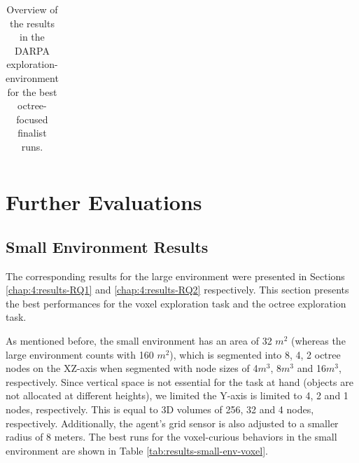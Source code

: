 \begin{longtable}{|l|c|c|c|c|}
    \caption{Overview of the results in the DARPA exploration-environment for the best octree-focused finalist runs.}
    \label{tab:results-evaluation-framework}
\end{longtable}



\newpage
\section{Further Evaluations}
\subsection{Small Environment Results}\label{chap-4:small-env-results}
The corresponding results for the large environment were presented in Sections \ref{chap:4:results-RQ1} and \ref{chap:4:results-RQ2} respectively. 
This section presents the best performances for the voxel exploration task and the octree exploration task. 

As mentioned before, the small environment has an area of 32 $m^2$ (whereas the large environment counts with 160 $m^2$), which is segmented into 8, 4, 2 octree nodes on the XZ-axis when segmented with node sizes of 4$m^3$, 8$m^3$ and 16$m^3$, respectively.
Since vertical space is not essential for the task at hand (objects are not allocated at different heights), we limited the Y-axis is limited to 4, 2 and 1 nodes, respectively. 
This is equal to 3D volumes of 256, 32 and 4 nodes, respectively. 
Additionally, the agent’s grid sensor is also adjusted to a smaller radius of 8 meters.
The best runs for the voxel-curious behaviors in the small environment are shown in Table \ref{tab:results-small-env-voxel}.

